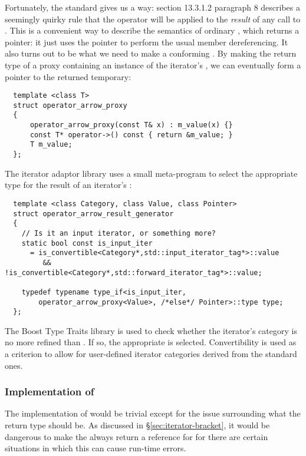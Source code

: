 \documentclass{netobjectdays}
\begin{document}
Fortunately, the standard gives us a way: section 13.3.1.2 paragraph 8
describes a seemingly quirky rule that the \code{->} operator will be
applied to the \emph{result} of any call to . This is
a convenient way to describe the semantics of ordinary
, which returns a pointer: it just uses the pointer
to perform the usual member dereferencing. It also turns out to be
what we need to make a conforming . By
making the return type of  a proxy containing an
instance of the iterator's , we can eventually form
a  pointer to the returned temporary:

{\footnotesize
\begin{verbatim}
  template <class T>
  struct operator_arrow_proxy
  {
      operator_arrow_proxy(const T& x) : m_value(x) {}
      const T* operator->() const { return &m_value; }
      T m_value;
  };
\end{verbatim}
}

The iterator adaptor library uses a small meta-program to select the
appropriate type for the result of an iterator's :

{\footnotesize
\begin{verbatim}
  template <class Category, class Value, class Pointer>
  struct operator_arrow_result_generator
  {
    // Is it an input iterator, or something more?
    static bool const is_input_iter
      = is_convertible<Category*,std::input_iterator_tag*>::value
         && !is_convertible<Category*,std::forward_iterator_tag*>::value;

    typedef typename type_if<is_input_iter,
        operator_arrow_proxy<Value>, /*else*/ Pointer>::type type;
  };
\end{verbatim}
}

The Boost Type Traits library is used to check whether the iterator's
category is no more refined than . If so,
the appropriate  is selected.
Convertibility is used as a criterion to allow for user-defined
iterator categories derived from the standard ones.


\subsubsection{Implementation of }

The implementation of  would be trivial except for
the issue surrounding what the return type should be.  As discussed in
\S\ref{sec:iterator-bracket}, it would be dangerous to make the
 always return a reference for
 for there are certain situations in which this can
cause run-time errors.
\end{document}
